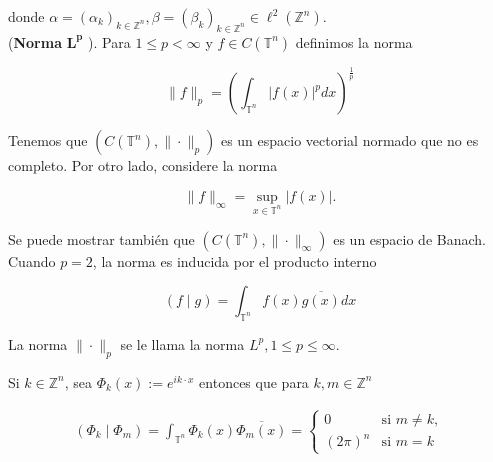 \documentclass[12pt]{article}
\newcommand\T{\mathbb{T}}
\begin{document}
donde $\alpha=\left(\alpha_k\right)_{k \in \mathbb{Z}^n}, \beta=\left(\beta_k\right)_{k \in \mathbb{Z}^n} \in \ell^2(\mathbb{Z}^n)$.\\



(\textbf{Norma} $\mathbf{L^p}$ ). Para $1 \leq p<\infty$ y $f \in C(\T^n)$ definimos la norma

$$
\|f\|_p=\left(\int_{\T^n}|f(x)|^p d x\right)^{\frac{1}{p}}
$$


Tenemos que $\left(C(\T^n),\|\cdot\|_p\right)$ es un espacio vectorial normado que no es completo.
Por otro lado, considere la norma

$$
\|f\|_{\infty}=\sup _{x \in \T^n}|f(x)| .
$$


Se puede mostrar también que $\left(C(\T^n),\|\cdot\|_{\infty}\right)$ es un espacio de Banach.
Cuando $p=2$, la norma es inducida por el producto interno

$$
(f \mid g)=\int_{\T^n} f(x) \overline{g(x)} d x
$$


La norma $\|\cdot\|_p$ se le llama la norma $L^p, 1 \leq p \leq \infty$.


\begin{theorem}\label{ortogonalidad}
Si $k \in \mathbb{Z}^n$, sea $\Phi_k(x):=e^{i k \cdot x}$ entonces que para $k, m \in \mathbb{Z}^n$

$$
\begin{array}{ll}
\displaystyle\left(\Phi_k \mid \Phi_m\right)=\int_{\T^n} \Phi_k(x) \overline{\Phi_m(x)}=\begin{cases}
0 \quad &\text{si }m\neq  k,\\
(2\pi)^n &\text{si } m=k
\end{cases}
\end{array}
$$
\end{theorem}
\end{document}
